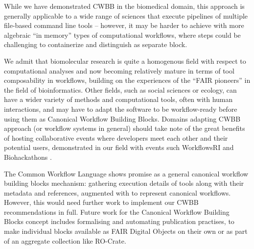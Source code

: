 While we have demonstrated CWBB in the biomedical domain, this approach is generally applicable to a wide range of sciences that execute pipelines of multiple file-based command line tools -- however, it may be harder to achieve with more algebraic ``in memory'' types of computational workflows, where steps could be challenging to containerize and distinguish as separate block.

We admit that biomolecular research is quite a homogenous field with respect to computational analyses and now becoming relatively mature in terms of tool composability in workflows, building on the experiences of the ``FAIR pioneers'' in the field of bioinformatics.
Other fields, such as social sciences or ecology, can have a wider variety of methods and computational tools, often with human interactions, and may have to adapt the software to be workflow-ready \cite{Brack 2022a} before using them as Canonical Workflow Building Blocks.
Domains adapting CWBB approach (or workflow systems in general) should take note of the great benefits of hosting collaborative events where developers meet each other and their potential users, demonstrated in our field with events such WorkflowsRI \cite{Ferreira da Silva 2021} and Biohackathons \cite{Garcia 2020}.

The Common Workflow Language shows promise as a general canonical workflow building blocks mechanism: gathering execution details of tools along with their metadata and references, augmented with  to represent canonical workflows.
However, this would need further work to implement our CWBB recommendations in full.
Future work for the Canonical Workflow Building Blocks concept includes formalising and automating publication practises, to make individual blocks available as FAIR Digital Objects on their own or as part of an aggregate collection like RO-Crate.
